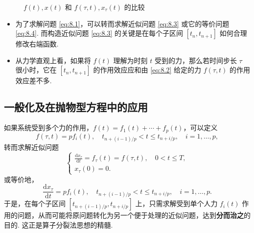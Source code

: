 \begin{figure}[H]
    \caption{$f(t), x(t)$ 和 $f(\tau, t), x_\tau(t)$ 的比较}
\end{figure}

\begin{note}[启示]
\begin{itemize}
    \item 为了求解问题 \eqref{eq:8.1}，可以转而求解近似问题 \eqref{eq:8.3} 或它的等价问题 \eqref{eq:8.4}. 而构造近似问题 \eqref{eq:8.3} 的关键是在每个子区间 $[t_n, t_{n+1}]$ 如何合理修改右端函数.
    \item 从力学直观上看，如果将 $f(t)$ 理解为时刻 $t$ 受到的力，那么若时间步长 $\tau$ 很小时，它在 $[t_n, t_{n+1}]$ 的作用效应应和由 \eqref{eq:8.2} 给定的力 $f(\tau, t)$ 的作用效应差不多.
\end{itemize}
\end{note}

\subsection{一般化及在抛物型方程中的应用}

\begin{remark}[一般化]
如果系统受到多个力的作用，$f(t) = f_1(t) + \cdots + f_p(t)$，可以定义
\begin{equation*}
    f(\tau, t) = p f_i(t), \quad t_{n+(i-1)/p} < t \leq t_{n+i/p}, \quad i = 1, \dots, p,
\end{equation*}
转而求解近似问题
\begin{equation*}
    \begin{cases}
        \frac{\mathrm{d}x_\tau}{\mathrm{d}t} = f_\tau(t) = f(\tau, t), \quad 0 < t \leq T, \\
        x_\tau(0) = 0.
    \end{cases}
\end{equation*}
或等价地，
\begin{equation*}
    \frac{\mathrm{d}x_\tau}{\mathrm{d}t} = p f_i(t), \quad t_{n+(i-1)/p} < t \leq t_{n+i/p}, \quad i = 1, \dots, p.
\end{equation*}
于是，在每个子区间 $[t_{n+(i-1)/p}, t_{n+i/p}]$ 上，只需求解受到单个人力 $f_i(t)$ 作用的问题，从而可能将原问题转化为另一个便于处理的近似问题，达到\textbf{分而治之}的目的. 这正是算子分裂法思想的精髓.
\end{remark}

